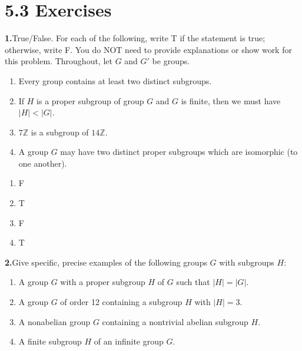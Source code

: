 \documentclass[10pt,]{book}
\theoremstyle{plain}
\theoremstyle{definition}
\theoremstyle{definition}
\theoremstyle{definition}
\theoremstyle{definition}
\numberwithin{equation}{section}
\def\Z{\mathbb{Z}}
\newcommand{\lt}{<}
\begin{document}
\section*{5.3 Exercises}
\noindent\textbf{1.}\quad{}True/False. For each of the following, write T if the statement is true; otherwise, write F. You do NOT need to provide explanations or show work for this problem. Throughout, let \(G\) and \(G'\) be groups. \leavevmode%
\begin{enumerate}[label=(\alph*)]
\item\hypertarget{li-278}{}Every group contains at least two distinct subgroups.%
\item\hypertarget{li-279}{}If \(H\) is a proper subgroup of group \(G\) and \(G\) is finite, then we must have \(|H|\lt |G|\).%
\item\hypertarget{li-280}{}\(7\Z\) is a subgroup of \(14\Z\).%
\item\hypertarget{li-281}{}A group \(G\) may have two distinct proper subgroups which are isomorphic (to one another).%
\end{enumerate}
%
\par\smallskip
\leavevmode%
\begin{multicols}{4}
\begin{enumerate}[label=(\alph*)]
\item\hypertarget{li-282}{}F%
\item\hypertarget{li-283}{}T%
\item\hypertarget{li-284}{}F%
\item\hypertarget{li-285}{}T%
\end{enumerate}
\end{multicols}
\par\smallskip
\noindent\textbf{2.}\quad{}Give specific, precise examples of the following groups \(G\) with subgroups \(H\): \leavevmode%
\begin{enumerate}[label=(\alph*)]
\item\hypertarget{li-286}{}A group \(G\) with a proper subgroup \(H\) of \(G\) such that \(|H|=|G|\).%
\item\hypertarget{li-287}{}A group \(G\) of order 12 containing a subgroup \(H\) with \(|H|=3\).%
\item\hypertarget{li-288}{}A nonabelian group \(G\) containing a nontrivial abelian subgroup \(H\).%
\item\hypertarget{li-289}{}A finite subgroup \(H\) of an infinite group \(G\).%
\end{enumerate}
%
\par\smallskip
\end{document}
